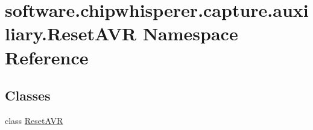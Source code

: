 \hypertarget{namespacesoftware_1_1chipwhisperer_1_1capture_1_1auxiliary_1_1ResetAVR}{}\section{software.\+chipwhisperer.\+capture.\+auxiliary.\+Reset\+A\+V\+R Namespace Reference}
\label{namespacesoftware_1_1chipwhisperer_1_1capture_1_1auxiliary_1_1ResetAVR}
\subsection*{Classes}
\begin{DoxyCompactItemize}
\item 
class \hyperlink{classsoftware_1_1chipwhisperer_1_1capture_1_1auxiliary_1_1ResetAVR_1_1ResetAVR}{Reset\+A\+V\+R}
\end{DoxyCompactItemize}
